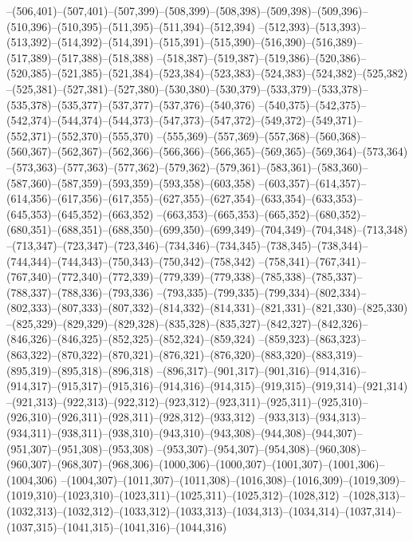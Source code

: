 --(506,401)--(507,401)--(507,399)--(508,399)--(508,398)--(509,398)--(509,396)--(510,396)--(510,395)--(511,395)--(511,394)--(512,394)
--(512,393)--(513,393)--(513,392)--(514,392)--(514,391)--(515,391)--(515,390)--(516,390)--(516,389)--(517,389)--(517,388)--(518,388)
--(518,387)--(519,387)--(519,386)--(520,386)--(520,385)--(521,385)--(521,384)--(523,384)--(523,383)--(524,383)--(524,382)--(525,382)
--(525,381)--(527,381)--(527,380)--(530,380)--(530,379)--(533,379)--(533,378)--(535,378)--(535,377)--(537,377)--(537,376)--(540,376)
--(540,375)--(542,375)--(542,374)--(544,374)--(544,373)--(547,373)--(547,372)--(549,372)--(549,371)--(552,371)--(552,370)--(555,370)
--(555,369)--(557,369)--(557,368)--(560,368)--(560,367)--(562,367)--(562,366)--(566,366)--(566,365)--(569,365)--(569,364)--(573,364)
--(573,363)--(577,363)--(577,362)--(579,362)--(579,361)--(583,361)--(583,360)--(587,360)--(587,359)--(593,359)--(593,358)--(603,358)
--(603,357)--(614,357)--(614,356)--(617,356)--(617,355)--(627,355)--(627,354)--(633,354)--(633,353)--(645,353)--(645,352)--(663,352)
--(663,353)--(665,353)--(665,352)--(680,352)--(680,351)--(688,351)--(688,350)--(699,350)--(699,349)--(704,349)--(704,348)--(713,348)
--(713,347)--(723,347)--(723,346)--(734,346)--(734,345)--(738,345)--(738,344)--(744,344)--(744,343)--(750,343)--(750,342)--(758,342)
--(758,341)--(767,341)--(767,340)--(772,340)--(772,339)--(779,339)--(779,338)--(785,338)--(785,337)--(788,337)--(788,336)--(793,336)
--(793,335)--(799,335)--(799,334)--(802,334)--(802,333)--(807,333)--(807,332)--(814,332)--(814,331)--(821,331)--(821,330)--(825,330)
--(825,329)--(829,329)--(829,328)--(835,328)--(835,327)--(842,327)--(842,326)--(846,326)--(846,325)--(852,325)--(852,324)--(859,324)
--(859,323)--(863,323)--(863,322)--(870,322)--(870,321)--(876,321)--(876,320)--(883,320)--(883,319)--(895,319)--(895,318)--(896,318)
--(896,317)--(901,317)--(901,316)--(914,316)--(914,317)--(915,317)--(915,316)--(914,316)--(914,315)--(919,315)--(919,314)--(921,314)
--(921,313)--(922,313)--(922,312)--(923,312)--(923,311)--(925,311)--(925,310)--(926,310)--(926,311)--(928,311)--(928,312)--(933,312)
--(933,313)--(934,313)--(934,311)--(938,311)--(938,310)--(943,310)--(943,308)--(944,308)--(944,307)--(951,307)--(951,308)--(953,308)
--(953,307)--(954,307)--(954,308)--(960,308)--(960,307)--(968,307)--(968,306)--(1000,306)--(1000,307)--(1001,307)--(1001,306)--(1004,306)
--(1004,307)--(1011,307)--(1011,308)--(1016,308)--(1016,309)--(1019,309)--(1019,310)--(1023,310)--(1023,311)--(1025,311)--(1025,312)--(1028,312)
--(1028,313)--(1032,313)--(1032,312)--(1033,312)--(1033,313)--(1034,313)--(1034,314)--(1037,314)--(1037,315)--(1041,315)--(1041,316)--(1044,316)
